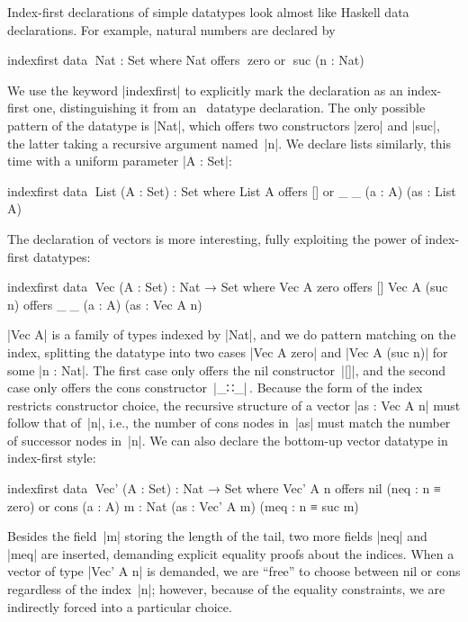 Index-first declarations of simple datatypes look almost like Haskell data declarations.
For example, natural numbers are declared by
\begin{code}
indexfirst data ^^^Nat : Set where
  Nat  offers  ^^^zero
       or      ^^^suc (n : Nat)
\end{code}
We use the keyword |indexfirst| to explicitly mark the declaration as an index-first one, distinguishing it from an \Agda\ datatype declaration.
The only possible pattern of the datatype is |Nat|, which offers two constructors |zero| and |suc|, the latter taking a recursive argument named~|n|.
We declare lists similarly, this time with a uniform parameter |A : Set|:
\begin{code}
indexfirst data ^^^List (A : Set) : Set where
  List A  offers  []
          or      _∷_ (a : A) (as : List A)
\end{code}
The declaration of vectors is more interesting, fully exploiting the power of index-first datatypes:
\begin{code}
indexfirst data ^^^Vec (A : Set) : Nat → Set where
  Vec A zero     offers  []
  Vec A (suc n)  offers  _∷_ (a : A) (as : Vec A n)
\end{code}
|Vec A| is a family of types indexed by |Nat|, and we do pattern matching on the index, splitting the datatype into two cases |Vec A zero| and |Vec A (suc n)| for some |n : Nat|.
The first case only offers the nil constructor~|[]|, and the second case only offers the cons constructor~|_∷_|\,.
Because the form of the index restricts constructor choice, the recursive structure of a vector |as : Vec A n| must follow that of~|n|, i.e., the number of cons nodes in~|as| must match the number of successor nodes in~|n|.
We can also declare the bottom-up vector datatype in index-first style:
\begin{code}
indexfirst data ^^^Vec' (A : Set) : Nat → Set where
  Vec' A n  offers  nil (neq : n ≡ zero)
            or      cons  (a : A) {m : Nat}
                          (as : Vec' A m) (meq : n ≡ suc m)
\end{code}
Besides the field~|m| storing the length of the tail, two more fields |neq| and |meq| are inserted, demanding explicit equality proofs about the indices.
When a vector of type |Vec' A n| is demanded, we are ``free'' to choose between nil or cons regardless of the index~|n|; however, because of the equality constraints, we are indirectly forced into a particular choice.



